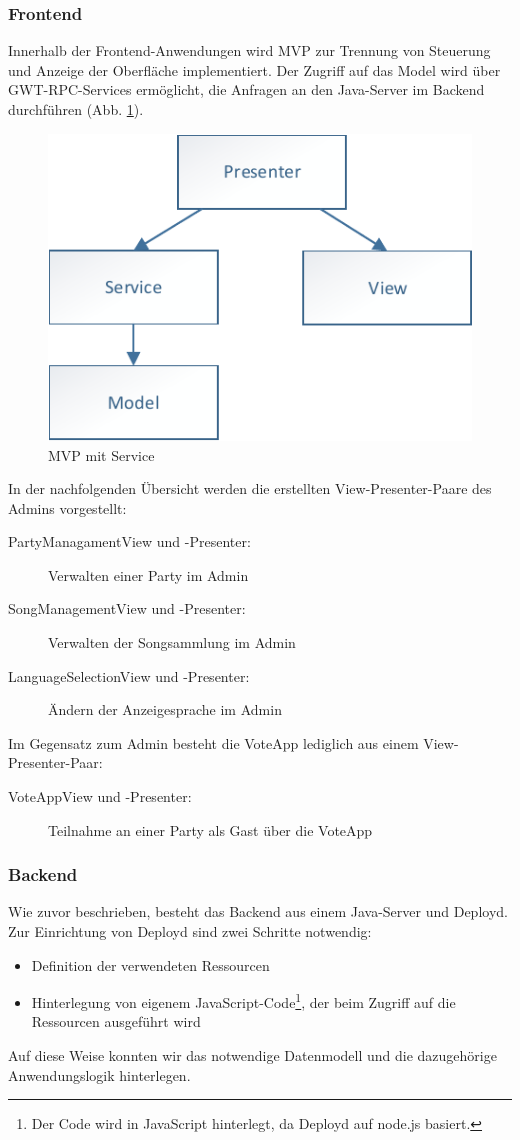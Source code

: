 \subsubsection{Frontend}
Innerhalb der Frontend-Anwendungen wird MVP zur Trennung von Steuerung und Anzeige der Oberfläche implementiert. Der Zugriff auf das Model wird über GWT-RPC-Services ermöglicht, die Anfragen an den Java-Server im Backend durchführen (Abb. \ref{fig:MVP-mit-Service}).

\begin{figure}[tbh]
\centering
\includegraphics[width=0.6\linewidth]{Bilder/MVP-mit-Service}
\caption{MVP mit Service}
\label{fig:MVP-mit-Service}
\end{figure}

In der nachfolgenden Übersicht werden die erstellten View-Presenter-Paare des Admins vorgestellt:
\begin{description}
	\item[PartyManagamentView und -Presenter:] Verwalten einer Party im Admin
	\item[SongManagementView und -Presenter:] Verwalten der Songsammlung im Admin
	\item[LanguageSelectionView und -Presenter:] Ändern der Anzeigesprache im Admin
\end{description}

Im Gegensatz zum Admin besteht die VoteApp lediglich aus einem View-Presenter-Paar:

\begin{description}
	\item[VoteAppView und -Presenter:] Teilnahme an einer Party als Gast über die VoteApp
\end{description}

\subsubsection{Backend}
Wie zuvor beschrieben, besteht das Backend aus einem Java-Server und Deployd.
Zur Einrichtung von Deployd sind zwei Schritte
notwendig:
\begin{itemize}
	\item Definition der verwendeten Ressourcen
	\item Hinterlegung von eigenem JavaScript-Code\footnote{Der Code wird in JavaScript hinterlegt, da Deployd auf node.js basiert.}, der beim Zugriff auf die Ressourcen ausgeführt wird
\end{itemize}
Auf diese Weise konnten wir das notwendige Datenmodell und die
dazugehörige Anwendungslogik hinterlegen.

